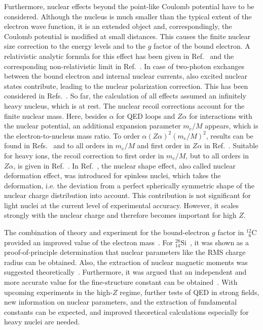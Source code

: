 Furthermore, nuclear effects beyond the point-like Coulomb potential have to be considered. Although the nucleus is much smaller than the typical extent of the electron wave function, it is an extended object and, correspondingly, the Coulomb potential is modified at small distances. This causes the finite nuclear size correction to the energy levels and to the $g$ factor of the bound electron. A relativistic analytic formula for this effect has been given in Ref.~\cite{Glazov2002} and the corresponding non-relativistic limit in Ref.~\cite{karshenboim2000}. In case of two-photon exchanges between the bound electron and internal nuclear currents, also excited nuclear states contribute, leading to the nuclear polarization correction. This has been considered in Refs.~\cite{Nefiodov,volotka2014}. 
So far, the calculation of all effects assumed an infinitely heavy nucleus, which is at rest. The nuclear recoil corrections account for the finite nuclear mass. Here, besides $\alpha$ for QED loops and $Z\alpha$ for interactions with the nuclear potential, an additional expansion parameter $m_e/M$ appears, which is the electron-to-nucleus mass ratio. To order $\alpha(Z\alpha)^2(m_e/M)^2$, results can be found in Refs.~\cite{eides2010} and to all orders in $m_e/M$ and first order in $Z\alpha$ in Ref.~\cite{pachucki2010}. Suitable for heavy ions, the recoil correction to first order in $m_e/M$, but to all orders in $Z\alpha$, is given in Ref.~\cite{shabaev2001,Shabaev2002}.
In Ref.~\cite{jacek2012}, the nuclear shape effect, also called nuclear deformation effect, was introduced for spinless nuclei, which takes the deformation, i.e. the deviation from a perfect spherically symmetric shape of the nuclear charge distribution into account. This contribution is not significant for light nuclei at the current level of experimental accuracy. However, it scales strongly with the nuclear charge and therefore becomes important for high $Z$. 

The combination of theory and experiment for the bound-electron $g$ factor in $^{12}_{\phantom{0}6}$C provided an improved value of the electron mass~\cite{Kohler2015,Sturm2014,Zatorski2017}. For $^{28}_{14}$Si~\cite{Sturm2011}, it was shown as a proof-of-principle determination that nuclear parameters like the RMS charge radius can be obtained. Also, the extraction of nuclear magnetic moments was suggested theoretically~\cite{Yerokhin2011,Werth2001}. Furthermore, it was argued that an independent and more accurate value for the fine-structure constant can be obtained~\cite{Shabaev2006,yerokhin2016,Yerokhin2016PRA}. With upcoming experiments in the high-$Z$ regime, further tests of QED in strong fields, new information on nuclear parameters, and the extraction of fundamental constants can be expected, and improved theoretical calculations especially for heavy nuclei are needed.

